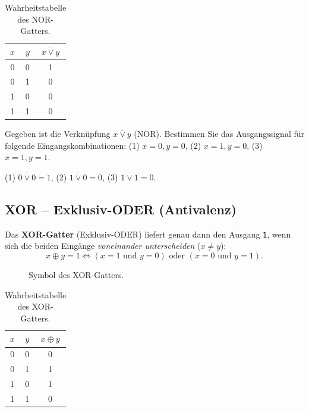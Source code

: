 \begin{table}[H]
    \centering
    \begin{tabular}{ccc}
        $x$ & $y$ & $\overline{x \vee y}$ \\\midrule\midrule
        0 & 0 & 1 \\\midrule
        0 & 1 & 0 \\\midrule
        1 & 0 & 0 \\\midrule
        1 & 1 & 0 \\
    \end{tabular}
    \caption{Wahrheitstabelle des NOR-Gatters.}
    \label{tab:nor}
\end{table}

\begin{mychallenge}
    Gegeben ist die Verknüpfung $\overline{x \vee y}$ (NOR). Bestimmen Sie das Ausgangssignal für folgende Eingangskombinationen:
    (1) $x=0, y=0$, (2) $x=1, y=0$, (3) $x=1, y=1$.
    \begin{myanswer}
        (1) $\overline{0 \vee 0} = 1$, (2) $\overline{1 \vee 0} = 0$, (3) $\overline{1 \vee 1} = 0$.
    \end{myanswer}
\end{mychallenge}

\subsection{XOR -- Exklusiv-ODER (Antivalenz)}

\begin{mydefinition}
    Das \textbf{XOR-Gatter} (Exklusiv-ODER) liefert genau dann den Ausgang \texttt{1}, wenn sich die beiden Eingänge \emph{voneinander unterscheiden} ($x \neq y$):
    \[
        x \oplus y = 1 \iff (x = 1 \text{ und } y = 0) \text{ oder } (x = 0 \text{ und } y = 1).
    \]
\end{mydefinition}

\begin{figure}[H]
    \centering
    
    \caption{Symbol des XOR-Gatters.}
    \label{fig:xor_gatter}
\end{figure}

\begin{table}[H]
    \centering
    \begin{tabular}{ccc}
        $x$ & $y$ & $x \oplus y$ \\\midrule\midrule
        0 & 0 & 0 \\\midrule
        0 & 1 & 1 \\\midrule
        1 & 0 & 1 \\\midrule
        1 & 1 & 0 \\
    \end{tabular}
    \caption{Wahrheitstabelle des XOR-Gatters.}
    \label{tab:xor}
\end{table}

